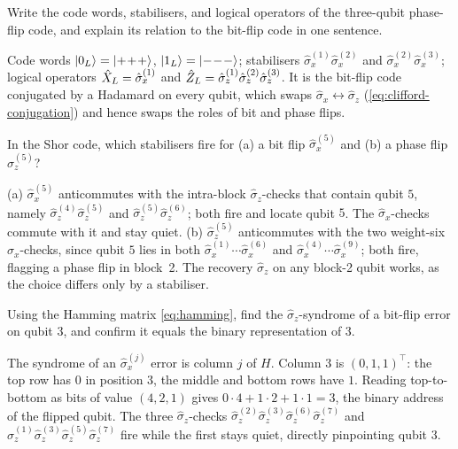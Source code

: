 \begin{exercise}
Write the code words, stabilisers, and logical operators of the
three-qubit phase-flip code, and explain its relation to the bit-flip
code in one sentence.
\begin{solution}
Code words $\ket{0_L}=\ket{+\!+\!+}$, $\ket{1_L}=\ket{-\!-\!-}$;
stabilisers $\hat\sigma_x^{(1)}\hat\sigma_x^{(2)}$ and
$\hat\sigma_x^{(2)}\hat\sigma_x^{(3)}$; logical operators
$\hat{X}_L=\hat\sigma_x^{(1)}$ and
$\hat{Z}_L=\hat\sigma_z^{(1)}\hat\sigma_z^{(2)}\hat\sigma_z^{(3)}$. It is
the bit-flip code conjugated by a Hadamard on every qubit, which swaps
$\hat\sigma_x\leftrightarrow\hat\sigma_z$ (\cref{eq:clifford-conjugation})
and hence swaps the roles of bit and phase flips.
\end{solution}
\end{exercise}

\begin{exercise}
In the Shor code, which stabilisers fire for (a) a bit flip
$\hat\sigma_x^{(5)}$ and (b) a phase flip $\hat\sigma_z^{(5)}$?
\begin{solution}
(a) $\hat\sigma_x^{(5)}$ anticommutes with the intra-block
$\hat\sigma_z$-checks that contain qubit $5$, namely
$\hat\sigma_z^{(4)}\hat\sigma_z^{(5)}$ and
$\hat\sigma_z^{(5)}\hat\sigma_z^{(6)}$; both fire and locate qubit $5$.
The $\hat\sigma_x$-checks commute with it and stay quiet. (b)
$\hat\sigma_z^{(5)}$ anticommutes with the two weight-six
$\hat\sigma_x$-checks, since qubit $5$ lies in both
$\hat\sigma_x^{(1)}\!\cdots\hat\sigma_x^{(6)}$ and
$\hat\sigma_x^{(4)}\!\cdots\hat\sigma_x^{(9)}$; both fire, flagging a
phase flip in block~2. The recovery $\hat\sigma_z$ on any block-2 qubit
works, as the choice differs only by a stabiliser.
\end{solution}
\end{exercise}

\begin{exercise}
Using the Hamming matrix \cref{eq:hamming}, find the
$\hat\sigma_z$-syndrome of a bit-flip error on qubit $3$, and confirm it
equals the binary representation of $3$.
\begin{solution}
The syndrome of an $\hat\sigma_x^{(j)}$ error is column $j$ of $H$. Column
$3$ is $(0,1,1)^{\!\top}$: the top row has $0$ in position $3$, the
middle and bottom rows have $1$. Reading top-to-bottom as bits of value
$(4,2,1)$ gives $0\cdot4+1\cdot2+1\cdot1=3$, the binary address of the
flipped qubit. The three $\hat\sigma_z$-checks
$\hat\sigma_z^{(2)}\hat\sigma_z^{(3)}\hat\sigma_z^{(6)}\hat\sigma_z^{(7)}$
and $\hat\sigma_z^{(1)}\hat\sigma_z^{(3)}\hat\sigma_z^{(5)}\hat\sigma_z^{(7)}$
fire while the first stays quiet, directly pinpointing qubit $3$.
\end{solution}
\end{exercise}


